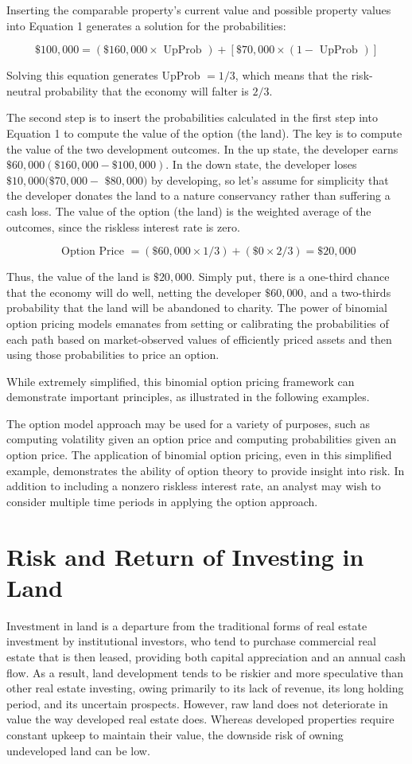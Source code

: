 \documentclass[11pt]{article}
\begin{document}
Inserting the comparable property's current value and possible property values into Equation 1 generates a solution for the probabilities:

$$
\$ 100,000=(\$ 160,000 \times \text { UpProb })+[\$ 70,000 \times(1-\text { UpProb })]
$$

Solving this equation generates UpProb $=1 / 3$, which means that the risk-neutral probability that the economy will falter is $2 / 3$.

The second step is to insert the probabilities calculated in the first step into Equation 1 to compute the value of the option (the land). The key is to compute the value of the two development outcomes. In the up state, the developer earns $\$ 60,000(\$ 160,000-\$ 100,000)$. In the down state, the developer loses $\$ 10,000(\$ 70,000-$ $\$ 80,000)$ by developing, so let's assume for simplicity that the developer donates the land to a nature conservancy rather than suffering a cash loss. The value of the option (the land) is the weighted average of the outcomes, since the riskless interest rate is zero.

$$
\text { Option Price }=(\$ 60,000 \times 1 / 3)+(\$ 0 \times 2 / 3)=\$ 20,000
$$

Thus, the value of the land is $\$ 20,000$. Simply put, there is a one-third chance that the economy will do well, netting the developer $\$ 60,000$, and a two-thirds probability that the land will be abandoned to charity. The power of binomial option pricing models emanates from setting or calibrating the probabilities of each path based on market-observed values of efficiently priced assets and then using those probabilities to price an option.

While extremely simplified, this binomial option pricing framework can demonstrate important principles, as illustrated in the following examples.

The option model approach may be used for a variety of purposes, such as computing volatility given an option price and computing probabilities given an option price. The application of binomial option pricing, even in this simplified example, demonstrates the ability of option theory to provide insight into risk. In addition to including a nonzero riskless interest rate, an analyst may wish to consider multiple time periods in applying the option approach.

\section*{Risk and Return of Investing in Land}
Investment in land is a departure from the traditional forms of real estate investment by institutional investors, who tend to purchase commercial real estate that is then leased, providing both capital appreciation and an annual cash flow. As a result, land development tends to be riskier and more speculative than other real estate investing, owing primarily to its lack of revenue, its long holding period, and its uncertain prospects. However, raw land does not deteriorate in value the way developed real estate does. Whereas developed properties require constant upkeep to maintain their value, the downside risk of owning undeveloped land can be low.
\end{document}
